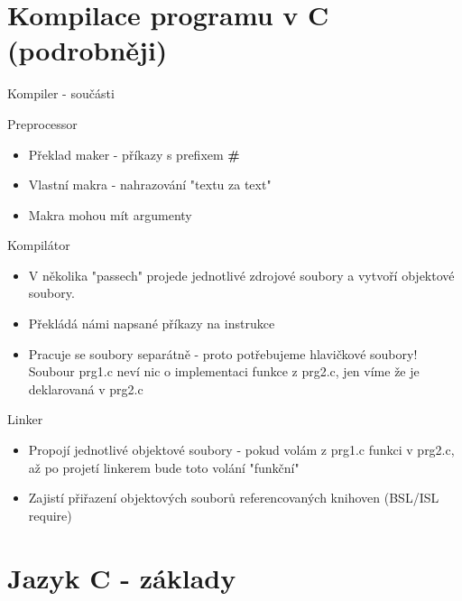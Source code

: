 \documentclass[9pt]{beamer}
\begin{document}
\section{Kompilace programu v C (podrobněji)}
\begin{frame}{Kompiler - součásti}
    \begin{block}{Preprocessor}
        \begin{itemize}
            \item Překlad maker - příkazy s prefixem \textbf{\#}
            \item Vlastní makra - nahrazování "textu za text"
            \item Makra mohou mít argumenty
        \end{itemize}
    \end{block}
    \pause
    \begin{block}{Kompilátor}
        \begin{itemize}
            \item V několika "passech" projede jednotlivé zdrojové soubory a vytvoří objektové soubory.
            \item Překládá námi napsané příkazy na instrukce
            \item Pracuje se soubory separátně - proto potřebujeme hlavičkové soubory! Soubour prg1.c neví nic o implementaci funkce z prg2.c, jen víme že je deklarovaná v prg2.c
        \end{itemize}
    \end{block}
    \pause
    \begin{block}{Linker}
         \begin{itemize}
             \item Propojí jednotlivé objektové soubory - pokud volám z prg1.c funkci v prg2.c, až po projetí linkerem bude toto volání "funkční"
             \item Zajistí přiřazení objektových souborů referencovaných knihoven (BSL/ISL require)
         \end{itemize}
    \end{block}
\end{frame}

\section{Jazyk C - základy}
\end{document}
